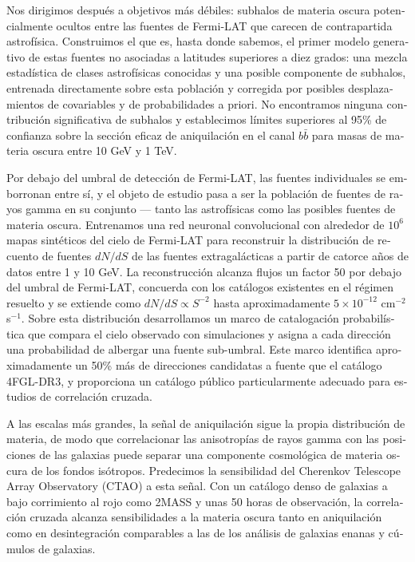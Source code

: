 \begin{otherlanguage}{spanish}
Nos dirigimos después a objetivos más débiles: subhalos de materia oscura potencialmente ocultos entre las fuentes de Fermi-LAT que carecen de contrapartida astrofísica. Construimos el que es, hasta donde sabemos, el primer modelo generativo de estas fuentes no asociadas a latitudes superiores a diez grados: una mezcla estadística de clases astrofísicas conocidas y una posible componente de subhalos, entrenada directamente sobre esta población y corregida por posibles desplazamientos de covariables y de probabilidades a priori.
No encontramos ninguna contribución significativa de subhalos y establecimos límites superiores al 95\% de confianza sobre la sección eficaz de aniquilación en el canal $b\bar{b}$ para masas de materia oscura entre 10 GeV y 1 TeV.

Por debajo del umbral de detección de Fermi-LAT, las fuentes individuales se emborronan entre sí, y el objeto de estudio pasa a ser la población de fuentes de rayos gamma en su conjunto --- tanto las astrofísicas como las posibles fuentes de materia oscura. Entrenamos una red neuronal convolucional con alrededor de $10^6$ mapas sintéticos del cielo de Fermi-LAT para reconstruir la distribución de recuento de fuentes $dN/dS$ de las fuentes extragalácticas a partir de catorce años de datos entre 1 y 10 GeV. La reconstrucción alcanza flujos un factor 50 por debajo del umbral de Fermi-LAT, concuerda con los catálogos existentes en el régimen resuelto y se extiende como $dN/dS \propto S^{-2}$ hasta aproximadamente $5\times10^{-12}$ cm$^{-2}$ s$^{-1}$.
Sobre esta distribución desarrollamos un marco de catalogación probabilística que compara el cielo observado con simulaciones y asigna a cada dirección una probabilidad de albergar una fuente sub-umbral. Este marco identifica aproximadamente un 50\% más de direcciones candidatas a fuente que el catálogo 4FGL-DR3, y proporciona un catálogo público particularmente adecuado para estudios de correlación cruzada.

A las escalas más grandes, la señal de aniquilación sigue la propia distribución de materia, de modo que correlacionar las anisotropías de rayos gamma con las posiciones de las galaxias puede separar una componente cosmológica de materia oscura de los fondos isótropos. Predecimos la sensibilidad del Cherenkov Telescope Array Observatory (CTAO) a esta señal. Con un catálogo denso de galaxias a bajo corrimiento al rojo como 2MASS y unas 50 horas de observación, la correlación cruzada alcanza sensibilidades a la materia oscura tanto en aniquilación como en desintegración comparables a las de los análisis de galaxias enanas y cúmulos de galaxias.


\end{otherlanguage}
